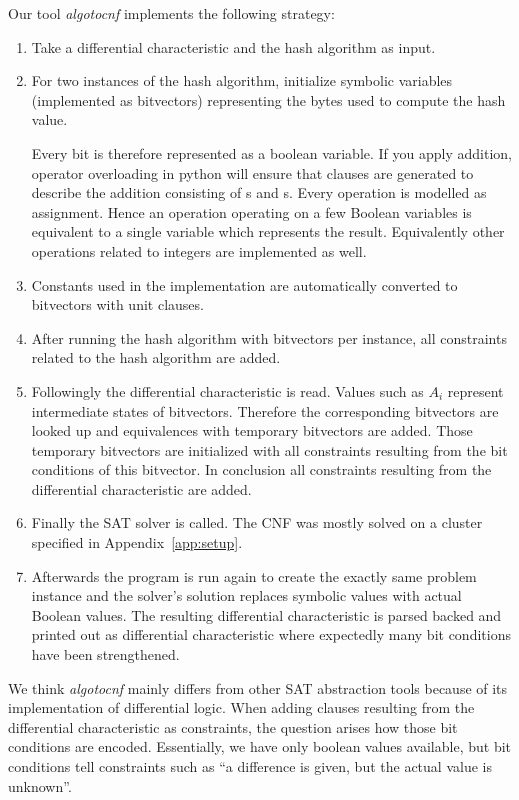 Our tool \emph{algotocnf} implements the following strategy:
\begin{enumerate}
  \item Take a differential characteristic and the hash algorithm as input.
  \item For two instances of the hash algorithm, initialize symbolic variables
    (implemented as bitvectors) representing the bytes used to compute
    the hash value.

    Every bit is therefore represented as a boolean variable.
    If you apply addition, operator overloading in python will ensure
    that clauses are generated to describe the addition consisting of
    s and s. Every operation is modelled as assignment.
    Hence an operation operating on a few Boolean variables is equivalent
    to a single variable which represents the result.
    Equivalently other operations related to integers are implemented as well.
  \item Constants used in the implementation are automatically converted
    to bitvectors with unit clauses.
  \item After running the hash algorithm with bitvectors per instance,
    all constraints related to the hash algorithm are added.
  \item Followingly the differential characteristic is read. Values such as $A_i$
    represent intermediate states of bitvectors. Therefore the corresponding bitvectors
    are looked up and equivalences with temporary bitvectors are added.
    Those temporary bitvectors are initialized with all constraints resulting from
    the bit conditions of this bitvector.
    In conclusion all constraints resulting from the differential characteristic are added.
  \item Finally the SAT solver is called. The CNF was mostly solved on a cluster
    specified in Appendix~\ref{app:setup}.
  \item Afterwards the program is run again to
    create the exactly same problem instance and the solver's solution replaces
    symbolic values with actual Boolean values. The resulting differential
    characteristic is parsed backed and printed out as differential characteristic
    where expectedly many bit conditions have been strengthened.
\end{enumerate}

We think \emph{algotocnf} mainly differs from other SAT abstraction tools because
of its implementation of differential logic. When adding clauses resulting from
the differential characteristic as constraints, the question arises how those
bit conditions are encoded. Essentially, we have only boolean values available,
but bit conditions tell constraints such as \enquote{a difference is given,
but the actual value is unknown}.

